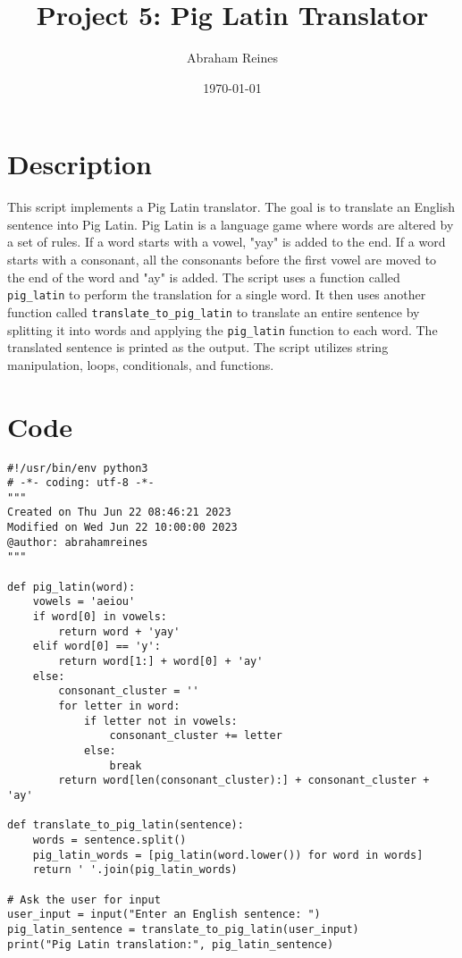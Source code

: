 \documentclass{article}
\begin{document}
\title{Project 5: Pig Latin Translator}
\author{Abraham Reines}
\date{\today}

\maketitle

\section{Description}
This script implements a Pig Latin translator. The goal is to translate an English sentence into Pig Latin. Pig Latin is a language game where words are altered by a set of rules. If a word starts with a vowel, "yay" is added to the end. If a word starts with a consonant, all the consonants before the first vowel are moved to the end of the word and "ay" is added. The script uses a function called \texttt{pig\_latin} to perform the translation for a single word. It then uses another function called \texttt{translate\_to\_pig\_latin} to translate an entire sentence by splitting it into words and applying the \texttt{pig\_latin} function to each word. The translated sentence is printed as the output. The script utilizes string manipulation, loops, conditionals, and functions.

\section{Code}
\begin{lstlisting}
#!/usr/bin/env python3
# -*- coding: utf-8 -*-
"""
Created on Thu Jun 22 08:46:21 2023
Modified on Wed Jun 22 10:00:00 2023
@author: abrahamreines
"""

def pig_latin(word):
    vowels = 'aeiou'
    if word[0] in vowels:
        return word + 'yay'
    elif word[0] == 'y':
        return word[1:] + word[0] + 'ay'
    else:
        consonant_cluster = ''
        for letter in word:
            if letter not in vowels:
                consonant_cluster += letter
            else:
                break
        return word[len(consonant_cluster):] + consonant_cluster + 'ay'

def translate_to_pig_latin(sentence):
    words = sentence.split()
    pig_latin_words = [pig_latin(word.lower()) for word in words]
    return ' '.join(pig_latin_words)

# Ask the user for input
user_input = input("Enter an English sentence: ")
pig_latin_sentence = translate_to_pig_latin(user_input)
print("Pig Latin translation:", pig_latin_sentence)
\end{lstlisting}
\end{document}
